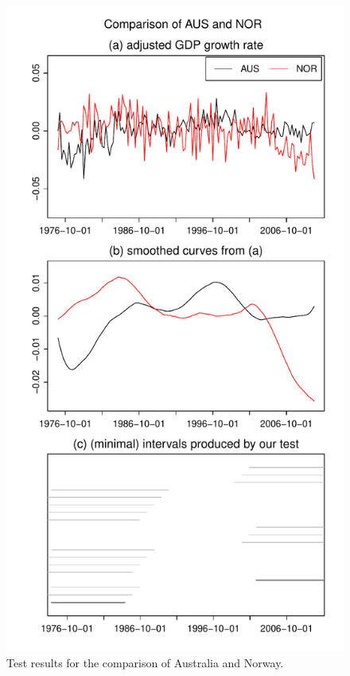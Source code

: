 \documentclass[12pt]{article}
\begin{document}
\begin{figure}
\begin{minipage}[t]{0.24\textwidth}
\includegraphics[width=\textwidth]{../output/plots/gdp/AUS_vs_NOR}
\caption{Test results for the comparison of Australia and Norway.}\label{fig:Australia:Norway}
\end{minipage}

\end{figure}
\end{document}
